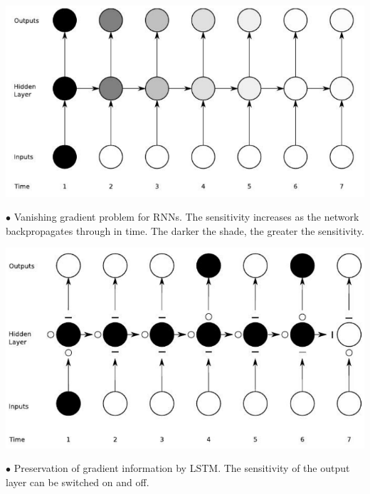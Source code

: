 \documentclass[letterpaper, 10.5pt,landscape]{article}
\begin{document}
\begin{multicols*}{3}
\begin{center}
    \begin{minipage}{0.75\linewidth}
    \includegraphics[width=\textwidth]{figures/RNNBackprop.png}
    \end{minipage}
\end{center}

\vspace{-5pt}
$\bullet$ Vanishing gradient problem for RNNs. The sensitivity increases as the network backpropagates through in time. The darker the shade, the greater the sensitivity.
\vspace{-5pt}

\begin{center}
    \begin{minipage}{0.75\linewidth}
    \includegraphics[width=\textwidth]{figures/LSTMBackprop.png}
    \end{minipage}
\end{center}
\vspace{-5pt}
$\bullet$ Preservation of gradient information by LSTM. The sensitivity of the output layer can be switched on and off.

\vspace{2pt}



\end{multicols*}
\end{document}
